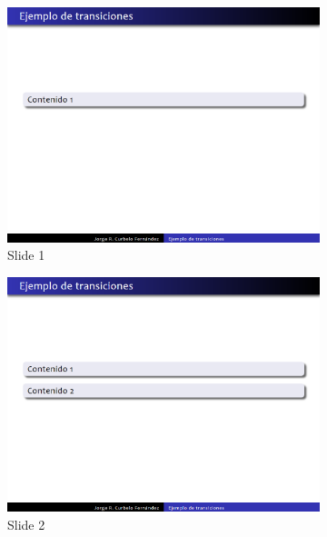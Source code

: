  		\begin{figure}[tb]
 			\centering
 			\begin{subfigure}[b]{0.3\textwidth}
 				\includegraphics[width=\textwidth]{img/content1}
 				\caption{Slide 1}
 				\label{fig:contents_a}	
 			\end{subfigure}
 			\hspace*{\fill}
 			\begin{subfigure}[b]{0.3\textwidth}
 				\includegraphics[width=\textwidth]{img/content2}
 				\caption{Slide 2}
 				\label{fig:contents_b}	
 			\end{subfigure}
 			\hspace*{\fill}
 			\begin{subfigure}[b]{0.3\textwidth}

\end{subfigure}
\end{figure}

